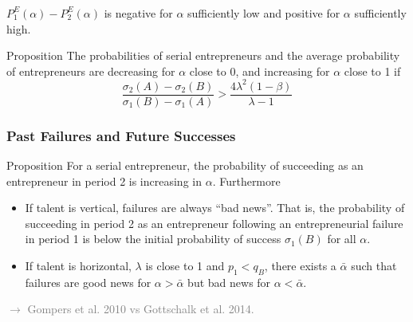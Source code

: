 \documentclass[slides,english,compress]{beamer}
\begin{document}
\begin{frame}
	\frametitle{}
	
\begin{lemma}
$P_1^E(\alpha)-P_2^E(\alpha)$ is negative for $\alpha$ sufficiently low and positive for $\alpha$ sufficiently high.
\end{lemma}

\begin{block}{Proposition}
 The probabilities of serial entrepreneurs and the average probability of entrepreneurs are decreasing for $\alpha$ close to 0, and increasing for $\alpha$ close to 1 if 
\begin{equation}\label{eq: prop 4}
\frac{ \sigma_2(A)- \sigma_2(B)}{ \sigma_1(B)- \sigma_1(A)}>\frac{4 \lambda^2 (1-\beta)}{\lambda -1}
\end{equation}
\end{block}

\end{frame}
\begin{frame}
	\frametitle{Past Failures and Future Successes}
\begin{block}{Proposition}
	For a serial entrepreneur, the probability of succeeding as an entrepreneur in period 2 is increasing in $\alpha$. Furthermore
 \begin{itemize}\setlength\itemsep{0em}
\item If talent is vertical, failures are always ``bad news''. That is, the probability of succeeding in period 2 as an entrepreneur following an entrepreneurial failure in period 1 is below the initial probability of success $\sigma_1 (B)$ for all $\alpha$. 
\item If talent is horizontal, $\lambda$ is close to 1 and  $p_1<q_B$, there exists a $\bar \alpha$ such that failures are good news for $\alpha>\bar \alpha$  but bad news for $\alpha< \bar \alpha$.
\end{itemize}
\end{block}

\vspace{0.5cm}
\textcolor{gray}{$\rightarrow$ Gompers et al. 2010 vs Gottschalk et al. 2014.}
\end{frame}
\end{document}
